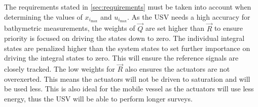 The requirements stated in \autoref{sec:requirements} must be taken into account when determining the values of $x_{i_\mathrm{max}}$ and $u_{i_\mathrm{max}}$. As the USV needs a high accuracy for bathymetric measurements, the weights of $\vec{Q}$ are set higher than $\vec{R}$ to ensure priority is focused on driving the states down to zero. The individual integral states are penalized higher than the system states to set further importance on driving the integral states to zero. This will ensure the reference signals are closely tracked. The low weights for $\vec{R}$ also ensures the actuators are not overexerted. This means the actuators will not be driven to saturation and will be used less. This is also ideal for the mobile vessel as the actuators will use less energy, thus the USV will be able to perform longer surveys.

